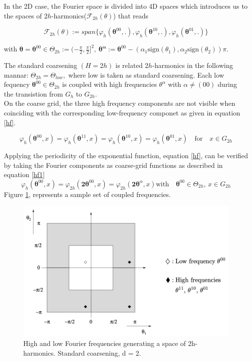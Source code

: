 \documentclass[12pt,a4paper]{article}
\begin{document}
	 \noindent In the 2D case, the Fourier space is divided into 4D spaces which introduces us to the spaces of $2h$-harmonics($\mathcal{F}_{2h}(\theta)$) that reads
	 
	 $$\mathcal{F}_{2h}(\theta) := span \{ \varphi _{h}(\mathbf{\theta}^{00},.), \varphi _{h}(\mathbf{\theta}^{10},.), \varphi _{h}(\mathbf{\theta}^{01},.)\}$$
	 
	 with $\mathbf{\theta} = \mathbf{\theta}^{00} \in \Theta_{2h} := (-\frac{\pi}{2},\frac{\pi}{2}]^{2},~ \mathbf{\theta^{\alpha} }:= \mathbf{\theta}^{00} - (\alpha_{1}\text{sign}(\theta_{1}), \alpha_{2}\text{sign}(\theta_{2}))\pi.$
	 
	 \noindent The standard coarsening $(H = 2h)$ is related $2h$-harmonics in the following mannar: $\Theta_{2h} = \Theta_{low},$ where low is taken as standard coarsening. Each low fequency 
	 $\mathbf{\theta}^{00} \in \Theta_{2h} $ is coupled with high frequencies $\theta^{\alpha} $ with $\alpha \ne (00)$ during the transistion from $G_{h}$ to $G_{2h}$.\\
	 
	\noindent On the coarse grid, the three high frequency components are not visible when coinciding with the corresponding low-frequency componet as given in equation \eqref{hf}.
	
	 \begin{equation}
	 	\varphi _{h}(\mathbf{\theta}^{00},x) = \varphi _{h}(\mathbf{\theta}^{11},x) = \varphi _{h}(\mathbf{\theta}^{10},x) = \varphi _{h}(\mathbf{\theta}^{01},x) \quad \text{for} \quad x \in G_{2h}
	 	\label{hf}
	 \end{equation}
	 
	\noindent Applying the periodicity of the exponential function, equation \eqref{hf}, can be verified by taking the Fourier components as coarse-grid functions as described in equation
	 \eqref{hf1}
	  \begin{equation}
	 	\varphi _{h}(\mathbf{\theta}^{00},x) = \varphi _{2h}(\mathbf{2\theta}^{00},x) = \varphi _{2h}(\mathbf{2\theta}^{\alpha},x) \text{with} \quad \mathbf{\theta}^{00} \in \Theta_{2h}, \,  x \in G_{2h}
	 	\label{hf1}
	 \end{equation}
\newpage	 
\noindent	Figure \ref{fig:FA}, represents a sample set of coupled frequencies. 
	
	 \begin{figure}[H]
	 	\centering
	 	\includegraphics[width=0.7\linewidth]{FA}
	 	\caption{High and low Fourier frequencies generating a space of 2h- harmonics. Standard coarsening, d = 2. \cite{wienands2004practical} }
	 	\label{fig:FA}
	 \end{figure}
 
\end{document}

